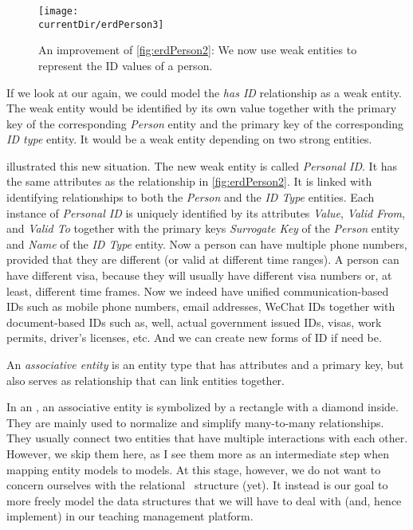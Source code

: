 \begin{figure}%
\centering%
\texttt{[image: \\currentDir/erdPerson3]}%
\caption{An improvement of \cref{fig:erdPerson2}: We now use weak entities to represent the ID values of a person.}%
\label{fig:erdPerson3}%
\end{figure}%
%
If we look at our  again, we could model the \emph{has ID} relationship as a weak entity.
The weak entity would be identified by its own value together with the primary key of the corresponding \emph{Person} entity and the primary key of the corresponding \emph{ID type} entity.
It would be a weak entity depending on two strong entities.

 illustrated this new situation.
The new weak entity is called \emph{Personal ID}.
It has the same attributes as the relationship in \cref{fig:erdPerson2}.
It is linked with identifying relationships to both the \emph{Person} and the \emph{ID Type} entities.
Each instance of \emph{Personal ID} is uniquely identified by its attributes \emph{Value}, \emph{Valid From}, and \emph{Valid To} together with the primary keys \emph{Surrogate Key} of the \emph{Person} entity and \emph{Name} of the \emph{ID Type} entity.
Now a person can have multiple phone numbers, provided that they are different (or valid at different time ranges).
A person can have different visa, because they will usually have different visa numbers or, at least, different time frames.
Now we indeed have unified communication-based IDs such as mobile phone numbers, email addresses, WeChat IDs together with document-based IDs such as, well, actual government issued IDs, visas, work permits, driver's licenses, etc.
And we can create new forms of ID if need be.%
%
\begin{definition}%
An \emph{associative entity} is an entity type that has attributes and a primary key, but also serves as relationship that can link entities together.%
\end{definition}%
%
In an , an associative entity is symbolized by a rectangle with a diamond inside.
They are mainly used to normalize and simplify many-to-many relationships.
They usually connect two entities that have multiple interactions with each other.
However, we skip them here, as I see them more as an intermediate step when mapping entity models to  models.
At this stage, however, we do not want to concern ourselves with the relational \db\ structure (yet).
It instead is our goal to more freely model the data structures that we will have to deal with (and, hence implement) in our teaching management platform.%
%
\FloatBarrier%
\endhsection%
%
